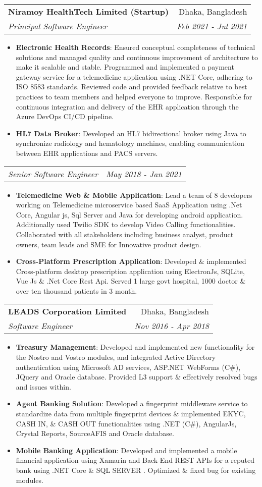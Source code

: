 \documentclass[letterpaper,11pt]{article}
\makeatletter
\newcommand{\resumeItem}[2]{
  \item\small{
    \textbf{#1}{: #2 \vspace{-2pt}}
  }
}
\newcommand{\resumeSubheading}[4]{
  \vspace{-1pt}\item
    \begin{tabular*}{0.97\textwidth}[t]{l@{\extracolsep{\fill}}r}
      \textbf{#1} & #2 \\
      \textit{\small#3} & \textit{\small #4} \\
    \end{tabular*}\vspace{-5pt}
}
\newcommand{\resumeSubSubheading}[2]{
    \begin{tabular*}{0.97\textwidth}{l@{\extracolsep{\fill}}r}
      \textit{\small#1} & \textit{\small #2} \\
    \end{tabular*}\vspace{-5pt}
}
\newcommand{\resumeItemListStart}{\begin{itemize}}
\newcommand{\resumeItemListEnd}{\end{itemize}\vspace{-5pt}}
\makeatother
\begin{document}
    \resumeSubheading
      {Niramoy HealthTech Limited (Startup) }{Dhaka, Bangladesh}
      {Principal Software Engineer}{Feb 2021 - Jul 2021}
      \resumeItemListStart
        \resumeItem{Electronic Health Records}
          {Ensured conceptual completeness of technical solutions and managed quality and continuous improvement of architecture to make it scalable and stable. 
          Programmed and implemented a payment gateway service for a telemedicine application using .NET Core, adhering to ISO 8583 standards. 
          Reviewed code and provided feedback relative to best practices to team members and helped everyone to improve.
          Responsible for continuous integration and delivery of the EHR application through the Azure DevOps CI/CD pipeline.}
        \resumeItem{HL7 Data Broker}
          {Developed an HL7 bidirectional broker using Java to synchronize radiology and hematology machines, enabling communication between EHR applications and PACS servers. \newline \newline \newline \newline}
      \resumeItemListEnd
      \resumeSubSubheading
      {Senior Software Engineer}{May 2018 - Jan 2021}
      \resumeItemListStart
        \resumeItem{Telemedicine Web \& Mobile Application}
         {Lead a team of 8 developers working on Telemedicine microservice based SaaS Application using .Net Core, Angular js, Sql Server and Java for developing android application. Additionally used Twilio SDK to develop Video Calling functionalities. Collaborated with all stakeholders including business analyst, product owners, team leads and
         SME for Innovative product design.}
        \resumeItem{Cross-Platform Prescription Application}
         {Developed \& implemented Cross-platform desktop prescription application using ElectronJs, SQLite,  Vue Js \& .Net Core Rest Api. Served 1 large govt hospital, 1000 doctor \& over ten thousand patients in 3 month.}
    \resumeItemListEnd
    
    \resumeSubheading
      {LEADS Corporation Limited}{Dhaka, Bangladesh}
      {Software Engineer}{Nov 2016 - Apr 2018}
      \resumeItemListStart
      \resumeItem{Treasury Management}
      {Developed and implemented new functionality for the Nostro and Vostro modules, and integrated Active Directory authentication using Microsoft AD services, ASP.NET WebForms (C\#), JQuery and Oracle database. Provided L3 support \& effectively resolved bugs and issues within.}
        \resumeItem{Agent Banking Solution}
          {Developed a fingerprint middleware service to standardize data from multiple fingerprint devices \& implemented EKYC, CASH IN, \& CASH OUT functionalities using .NET (C\#), AngularJs, Crystal Reports, SourceAFIS and Oracle database.}
        \resumeItem{Mobile Banking Application}
          {Developed and implemented a mobile financial application using Xamarin and  Back-End REST APIs for a reputed bank using .NET Core \& SQL SERVER . Optimized \& fixed bug for existing modules. }
      \resumeItemListEnd
\end{document}
